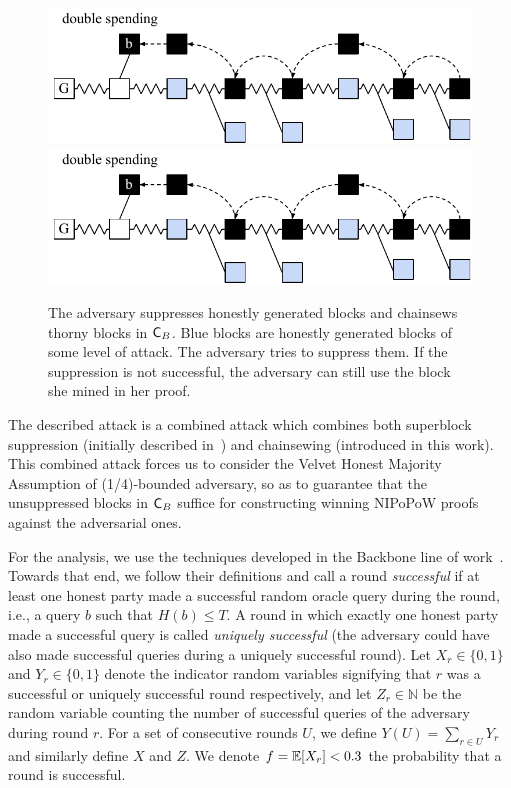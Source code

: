 \begin{figure}[h!]
    \begin{center}
        \iftwocolumn
            \includegraphics[width=0.95\columnwidth]{figures/attack_after_update-crop.pdf}
        \else
            \includegraphics[width=0.6\columnwidth]{figures/attack_after_update-crop.pdf}
        \fi
	\end{center}
	\caption{The adversary suppresses honestly generated blocks and chainsews thorny blocks in $\mathsf{C}_B$. Blue blocks are honestly generated blocks of some level of attack. The adversary tries to suppress them. If the suppression is not successful, the adversary can still use the block she mined in her proof.}
	\label{fig:attack_after_update}
\end{figure}

The described attack is a combined attack which combines both superblock suppression (initially described in~\cite{nipopows}) and chainsewing (introduced in this work). This combined attack forces us to consider the Velvet Honest Majority Assumption of (1/4)-bounded adversary, so as to guarantee that the unsuppressed blocks in $\mathsf{C}_B$ suffice for constructing winning NIPoPoW proofs against the adversarial ones.

For the analysis, we use the techniques
developed in the Backbone line of work~\cite{backbone}. Towards that end, we
follow their definitions and call a round \emph{successful} if at least one
honest party made a successful random oracle query during the round, i.e., a
query $b$ such that $H(b) \leq T$. A round in which exactly one honest party
made a successful query is called \emph{uniquely successful} (the adversary
could have also made successful queries during a uniquely successful round). Let
$X_r \in \{0, 1\}$ and $Y_r \in \{0, 1\}$ denote the indicator random variables
signifying that $r$ was a successful or uniquely successful round respectively,
and let $Z_r \in \mathbb{N}$ be the random variable counting the number of
successful queries of the adversary during round $r$. For a set of consecutive
rounds $U$, we define $Y(U) = \sum_{r \in U} Y_r$ and similarly define $X$ and
$Z$. We denote $f = \operatorname{\mathbb{E}}[X_r] < 0.3$ the probability that a round is successful.

